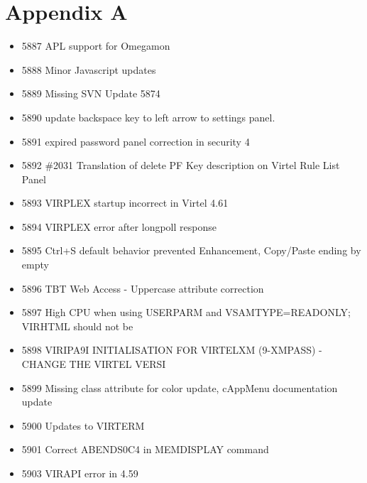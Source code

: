 \documentclass[letterpaper,10pt,english]{sphinxmanual}
\begin{document}
\chapter{Appendix A}
\label{\detokenize{TN202101:appendix-a}}
\begin{itemize}
\item {} 
5887 APL support for Omegamon

\item {} 
5888 Minor Javascript updates

\item {} 
5889 Missing SVN Update 5874

\item {} 
5890 update backspace key to left arrow to settings panel.

\item {} 
5891 expired password panel correction in security 4

\item {} 
5892 \#2031 Translation of delete PF Key description on Virtel Rule List Panel

\item {} 
5893 VIRPLEX startup incorrect in Virtel 4.61

\item {} 
5894 VIRPLEX error after longpoll response

\item {} 
5895 Ctrl+S default behavior prevented Enhancement, Copy/Paste ending by empty

\item {} 
5896 TBT Web Access - Uppercase attribute correction

\item {} 
5897 High CPU when using USERPARM and VSAMTYPE=READONLY; VIRHTML should not be

\item {} 
5898 VIRIPA9I INITIALISATION FOR VIRTELXM (9-XMPASS) - CHANGE THE VIRTEL VERSI

\item {} 
5899 Missing class attribute for color update, cAppMenu documentation update

\item {} 
5900 Updates to VIRTERM

\item {} 
5901 Correct ABENDS0C4 in MEMDISPLAY command

\item {} 
5903 VIRAPI error in 4.59


\end{itemize}
\end{document}
